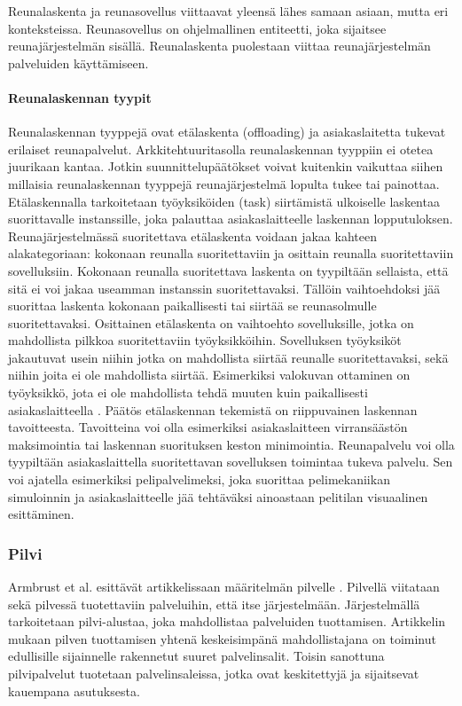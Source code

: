 Reunalaskenta ja reunasovellus viittaavat yleensä lähes samaan asiaan, mutta eri konteksteissa. 
Reunasovellus on ohjelmallinen entiteetti, joka sijaitsee reunajärjestelmän sisällä.
Reunalaskenta puolestaan viittaa reunajärjestelmän palveluiden käyttämiseen.

\paragraph{Reunalaskennan tyypit}

Reunalaskennan tyyppejä ovat etälaskenta (offloading) ja asiakaslaitetta tukevat erilaiset reunapalvelut.
Arkkitehtuuritasolla reunalaskennan tyyppiin ei otetea juurikaan kantaa. 
Jotkin suunnittelupäätökset voivat kuitenkin vaikuttaa siihen millaisia reunalaskennan tyyppejä reunajärjestelmä lopulta tukee tai painottaa.
Etälaskennalla tarkoitetaan työyksiköiden (task) siirtämistä ulkoiselle laskentaa suorittavalle instanssille, joka palauttaa asiakaslaitteelle laskennan lopputuloksen. 
Reunajärjestelmässä suoritettava etälaskenta voidaan jakaa kahteen alakategoriaan: kokonaan reunalla suoritettaviin ja osittain reunalla suoritettaviin sovelluksiin\cite{mach17mobile}.
Kokonaan reunalla suoritettava laskenta on tyypiltään sellaista, että sitä ei voi jakaa useamman instanssin suoritettavaksi.
Tällöin vaihtoehdoksi jää suorittaa laskenta kokonaan paikallisesti tai siirtää se reunasolmulle suoritettavaksi.
Osittainen etälaskenta on vaihtoehto sovelluksille, jotka on mahdollista pilkkoa suoritettaviin työyksikköihin. 
Sovelluksen työyksiköt jakautuvat usein niihin jotka on mahdollista siirtää reunalle suoritettavaksi, sekä niihin joita ei ole mahdollista siirtää. 
Esimerkiksi valokuvan ottaminen on työyksikkö, jota ei ole mahdollista tehdä muuten kuin paikallisesti asiakaslaitteella \cite{mach17mobile}.
Päätös etälaskennan tekemistä on riippuvainen laskennan tavoitteesta. 
Tavoitteina voi olla esimerkiksi asiakaslaitteen virransäästön maksimointia tai laskennan suorituksen keston minimointia.
Reunapalvelu voi olla tyypiltään asiakaslaittella suoritettavan sovelluksen toimintaa tukeva palvelu. Sen voi ajatella esimerkiksi pelipalvelimeksi, joka suorittaa pelimekaniikan simuloinnin ja asiakaslaitteelle jää tehtäväksi ainoastaan pelitilan visuaalinen esittäminen.  



\subsubsection{Pilvi}
Armbrust et al. esittävät artikkelissaan määritelmän pilvelle \cite{armbrust2010view}. 
Pilvellä viitataan sekä pilvessä tuotettaviin palveluihin, että itse järjestelmään.
Järjestelmällä tarkoitetaan pilvi-alustaa, joka mahdollistaa palveluiden tuottamisen.
Artikkelin mukaan pilven tuottamisen yhtenä keskeisimpänä mahdollistajana on toiminut edullisille sijainnelle rakennetut suuret palvelinsalit.
Toisin sanottuna pilvipalvelut tuotetaan palvelinsaleissa, jotka ovat keskitettyjä ja sijaitsevat kauempana asutuksesta. 


